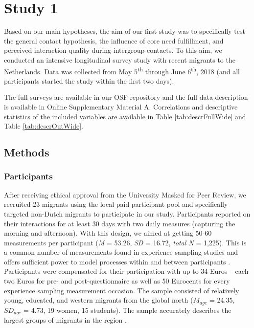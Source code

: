 \section{Study 1}

Based on our main hypotheses, the aim of our first study was to
specifically test the general contact hypothesis, the influence of core
need fulfillment, and perceived interaction quality during intergroup
contacts. To this aim, we conducted an intensive longitudinal survey
study with recent migrants to the Netherlands. Data was collected from
May 5\textsuperscript{th} through June 6\textsuperscript{th}, 2018 (and
all participants started the study within the first two days).

The full surveys are available in our OSF repository
\citep{KreienkampMasked2022a} and the full data description is available
in Online Supplementary Material A. Correlations and descriptive
statistics of the included variables are available in Table
\ref{tab:descrFullWide} and Table \ref{tab:descrOutWide}.

\subsection{Methods}

\subsubsection{Participants}

After receiving ethical approval from the University Masked for Peer
Review, we recruited 23 migrants using the local paid participant pool
and specifically targeted non-Dutch migrants to participate in our
study. Participants reported on their interactions for at least 30 days
with two daily measures (capturing the morning and afternoon). With this
design, we aimed at getting 50-60 measurements per participant
(\textit{M} = 53.26, \textit{SD} = 16.72, \textit{total N} = 1,225).
This is a common number of measurements found in experience sampling
studies and offers sufficient power to model processes within and
between participants
\citep[e.g., for a systematic review see][]{AanhetRot2012}. Participants
were compensated for their participation with up to 34 Euros -- each two
Euros for pre- and post-questionnaire as well as 50 Eurocents for every
experience sampling measurement occasion. The sample consisted of
relatively young, educated, and western migrants from the global north
(\(M_{age}\) = 24.35, \(SD_{age}\) = 4.73, 19 women, 15 students). The
sample accurately describes the largest groups of migrants in the region
\citep[][]{GemeenteGroningen2015}.

